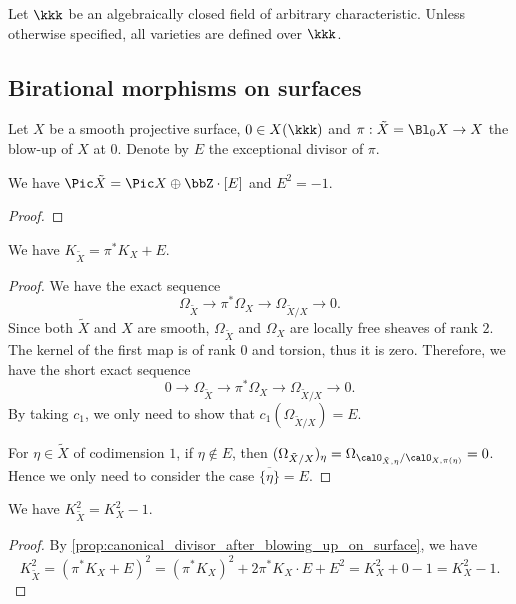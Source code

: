 Let \(\kkk\) be an algebraically closed field of arbitrary characteristic.
Unless otherwise specified, all varieties are defined over \(\kkk\).

\subsection{Birational morphisms on surfaces}

    Let \(X\) be a smooth projective surface, \(0 \in X(\kkk)\) and \(\pi:\tilde{X} = \Bl_0 X \to X\) the blow-up of \(X\) at \(0\).
    Denote by \(E\) the exceptional divisor of \(\pi\).
    
    \begin{proposition}\label{prop:picard_group_after_blowing_up_on_surface}
        We have \(\Pic \tilde{X} = \Pic X \oplus \bbZ \cdot [E]\) and \(E^2 = -1\).
    \end{proposition}
    \begin{proof}
    \end{proof}

    \begin{proposition}\label{prop:canonical_divisor_after_blowing_up_on_surface}
        We have \(K_{\tilde{X}} = \pi^* K_X + E\).
    \end{proposition}
    \begin{proof}
        We have the exact sequence
        \[ \Omega_{\tilde{X}} \to \pi^* \Omega_X \to \Omega_{\tilde{X}/X} \to 0. \]
        Since both \(\tilde{X}\) and \(X\) are smooth, \(\Omega_{\tilde{X}}\) and \(\Omega_X\) are locally free sheaves of rank \(2\).
        The kernel of the first map is of rank \(0\) and torsion, thus it is zero.
        Therefore, we have the short exact sequence
        \[ 0 \to \Omega_{\tilde{X}} \to \pi^* \Omega_X \to \Omega_{\tilde{X}/X} \to 0. \]
        By taking \(c_1\), we only need to show that \(c_1(\Omega_{\tilde{X}/X}) = E\).

        For \(\eta \in \tilde{X}\) of codimension \(1\), if \(\eta \notin E\), then \((\Omega_{\tilde{X}/X})_\eta = \Omega_{\calO_{\tilde{X},\eta}/\calO_{X,\pi(\eta)}} = 0\).
        Hence we only need to consider the case \(\overline{\{\eta\}} = E\).
    \end{proof}


    \begin{corollary}\label{cor:self-intersection_number_of_canonical_divisor_after_blowing_up_on_surface}
        We have \(K_{\tilde{X}}^2 = K_X^2 - 1\).
    \end{corollary}
    \begin{proof}
        By \cref{prop:canonical_divisor_after_blowing_up_on_surface}, we have
        \[ K_{\tilde{X}}^2 = (\pi^* K_X + E)^2 = (\pi^* K_X)^2 + 2 \pi^* K_X \cdot E + E^2 = K_X^2 + 0 - 1 = K_X^2 - 1. \]
    \end{proof}
    
